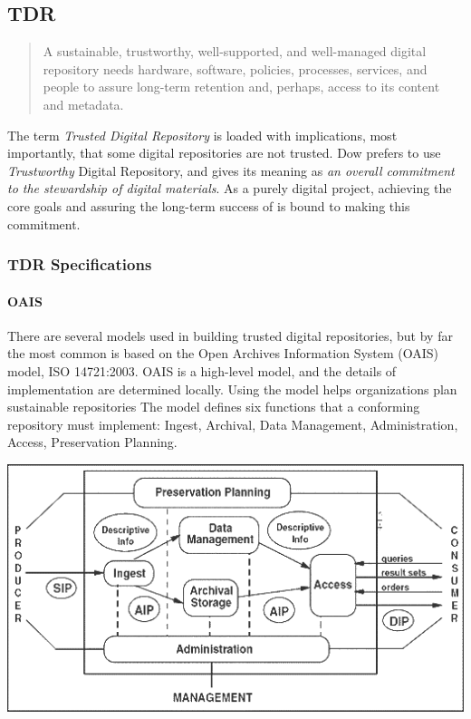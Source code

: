 \subsection{TDR}
\begin{quote}A sustainable, trustworthy, well-supported, and well-managed digital repository needs hardware, software, policies, processes, services, and people to assure long-term retention and, perhaps, access to its content and metadata.\cite{dow_elizabeth_2009} \end{quote}
The term \emph{Trusted Digital Repository} is loaded with implications, most importantly, that some digital repositories are not trusted. Dow prefers to use \emph{Trustworthy} Digital Repository, and gives its meaning as \emph{an overall commitment to the stewardship of digital materials}\cite{dow_elizabeth_2009}. As a purely digital project, achieving the core goals and assuring the long-term success of \projectname{} is bound to making this commitment. 

\subsubsection{TDR Specifications}
\paragraph{OAIS}
There are several models used in building trusted digital repositories, but by far the most common is based on the Open Archives Information System (OAIS) model, ISO 14721:2003. OAIS is a high-level model, and the details of implementation are determined locally. Using the model helps organizations plan sustainable repositories\cite{harvey} The model defines six functions that a conforming repository must implement: Ingest, Archival, Data Management, Administration, Access, Preservation Planning.

\includegraphics[width=\textwidth]{OAIS.png}\cite{oais_image}
